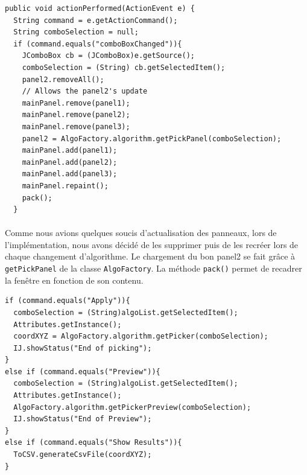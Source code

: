 \begin{center}
\begin{fmpage}{15cm}
\begin{small}
\begin{lstlisting}[breaklines=true, breakatwhitespace=true]
public void actionPerformed(ActionEvent e) {
  String command = e.getActionCommand();
  String comboSelection = null;
  if (command.equals("comboBoxChanged")){
    JComboBox cb = (JComboBox)e.getSource();
    comboSelection = (String) cb.getSelectedItem();
    panel2.removeAll();
    // Allows the panel2's update
    mainPanel.remove(panel1);
    mainPanel.remove(panel2);
    mainPanel.remove(panel3);
    panel2 = AlgoFactory.algorithm.getPickPanel(comboSelection);
    mainPanel.add(panel1);
    mainPanel.add(panel2);
    mainPanel.add(panel3);
    mainPanel.repaint();
    pack();
  }
\end{lstlisting}
\end{small}
\end{fmpage}
\end{center}

\paragraph*{}
Comme nous avions quelques soucis d'actualisation des panneaux, lors de l'implémentation, nous avons décidé de les supprimer puis de les recréer lors de chaque changement d'algorithme. Le chargement du bon panel2 se fait gr\^ace à \texttt{getPickPanel} de la classe \texttt{AlgoFactory}. La méthode \texttt{pack()} permet de recadrer la fenêtre en fonction de son contenu. 

\begin{center}
\begin{fmpage}{15cm}
\begin{small}
\begin{lstlisting}
if (command.equals("Apply")){
  comboSelection = (String)algoList.getSelectedItem();
  Attributes.getInstance();
  coordXYZ = AlgoFactory.algorithm.getPicker(comboSelection);
  IJ.showStatus("End of picking");
}
else if (command.equals("Preview")){
  comboSelection = (String)algoList.getSelectedItem();
  Attributes.getInstance();
  AlgoFactory.algorithm.getPickerPreview(comboSelection);
  IJ.showStatus("End of Preview");
}
else if (command.equals("Show Results")){
  ToCSV.generateCsvFile(coordXYZ);
}
\end{lstlisting}
\end{small}	
\end{fmpage}
\end{center}
%
